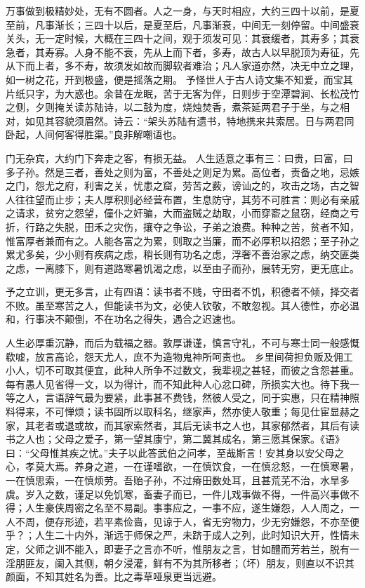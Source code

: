 \documentclass[letterpaper,12pt,english]{sphinxmanual}
\begin{document}
万事做到极精妙处，无有不圆者。人之一身，与天时相应，大约三四十以前，是夏至前，凡事渐长；三四十以后，是夏至后，凡事渐衰，中间无一刻停留。中间盛衰关头，无一定时候，大概在三四十之间，观于须发可见：其衰缓者，其寿多；其衰急者，其寿寡。人身不能不衰，先从上而下者，多寿，故古人以早脱顶为寿征，先从下而上者，多不寿，故须发如故而脚软者难治；凡人家道亦然，决无中立之理，如一树之花，开到极盛，便是摇落之期。
予怪世人于古人诗文集不知爱，而宝其片纸只字，为大惑也。余昔在龙眠，苦于无客为伴，日则步于空潭碧涧、长松茂竹之侧，夕则掩关读苏陆诗，以二鼓为度，烧烛焚香，煮茶延两君子于坐，与之相对，如见其容貌须眉然。诗云：“架头苏陆有遗书，特地携来共索居。日与两君同卧起，人间何客得胜渠。”良非解嘲语也。

门无杂宾，大约门下奔走之客，有损无益。
人生适意之事有三：曰贵，曰富，曰多子孙。然是三者，善处之则为富，不善处之则足为累。高位者，责备之地，忌嫉之门，怨尤之府，利害之关，忧患之窟，劳苦之薮，谤讪之的，攻击之场，古之智人往往望而止步；夫人厚积则必经营布置，生息防守，其劳不可胜言：则必有亲戚之请求，贫穷之怨望，僮仆之奸骗，大而盗贼之劫取，小而穿窬之鼠窃，经商之亏折，行路之失脱，田禾之灾伤，攘夺之争讼，子弟之浪费。种种之苦，贫者不知，惟富厚者兼而有之。人能各富之为累，则取之当廉，而不必厚积以招怨；至子孙之累尤多矣，少小则有疾病之虑，稍长则有功名之虑，浮奢不善治家之虑，纳交匪类之虑，一离膝下，则有道路寒暑饥渴之虑，以至由子而孙，展转无穷，更无底止。

予之立训，更无多言，止有四语：读书者不贱，守田者不饥，积德者不倾，择交者不败。虽至寒苦之人，但能读书为文，必使人钦敬，不敢忽视。其人德性，亦必温和，行事决不颠倒，不在功名之得失，遇合之迟速也。

人生必厚重沉静，而后为载福之器。敦厚谦谨，慎言守礼，不可与寒士同一般感慨欷嘘，放言高论，怨天尤人，庶不为造物鬼神所呵责也。
乡里间荷担负贩及佣工小人，切不可取其便宜，此种人所争不过数文，我辈视之甚轻，而彼之含怨甚重。每有愚人见省得一文，以为得计，而不知此种人心忿口碑，所损实大也。待下我一等之人，言语辞气最为要紧，此事甚不费钱，然彼人受之，同于实惠，只在精神照料得来，不可惮烦；读书固所以取科名，继家声，然亦使人敬重；每见仕宦显赫之家，其老者或退或故，而其家索然者，其后无读书之人也，其家郁然者，其后有读书之人也；父母之爱子，第一望其康宁，第二冀其成名，第三愿其保家。《语》曰：“父母惟其疾之忧。”夫子以此答武伯之问孝，至哉斯言！安其身以安父母之心，孝莫大焉。养身之道，一在谨嗜欲，一在慎饮食，一在慎忿怒，一在慎寒暑，一在慎思索，一在慎烦劳。吾贻子孙，不过瘠田数处耳，且甚荒芜不治，水旱多虞。岁入之数，谨足以免饥寒，畜妻子而已，一件儿戏事做不得，一件高兴事做不得；人生豪侠周密之名至不易副。事事应之，一事不应，遂生嫌怨，人人周之，一人不周，便存形迹，若平素俭啬，见谅于人，省无穷物力，少无穷嫌怨，不亦至便乎？；人生二十内外，渐远于师保之严，未跻于成人之列，此时知识大开，性情未定，父师之训不能入，即妻子之言亦不听，惟朋友之言，甘如醴而芳若兰，脱有一淫朋匪友，阑入其侧，朝夕浸灌，鲜有不为其所移者；（坏）朋友，则直以不识其颜面，不知其姓名为善。比之毒草哑泉更当远避。
\end{document}
